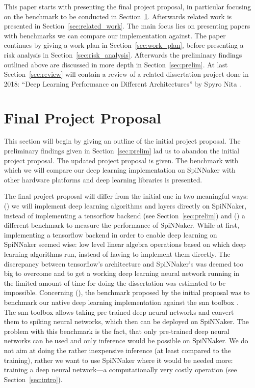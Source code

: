 \documentclass{article}
\begin{document}
This paper starts with presenting the final project
proposal, in particular focusing on the benchmark to be
conducted in Section~\ref{sec:proposal}.
Afterwards related work is presented in
Section~\ref{sec:related_work}.
The main focus lies on presenting papers with benchmarks
we can compare our implementation against.
The paper continues by giving a work plan in
Section~\ref{sec:work_plan}, before presenting a risk
analysis in Section~\ref{sec:risk_analysis}.
Afterwards the preliminary findings outlined above are
discussed in more depth in Section~\ref{sec:prelim}.
At last Section~\ref{sec:review} will contain a review of a
related dissertation project done in 2018:
``Deep Learning Performance on Different Architectures'' by
Spyro Nita \citep{nita_2018}.


\section{Final Project Proposal} %
\label{sec:proposal}

This section will begin by giving an outline of the initial
project proposal.
The preliminary findings given in Section~\ref{sec:prelim}
lad us to abandon the initial project proposal.
The updated project proposal is given.
The benchmark with which we will compare our deep learning
implementation on SpiNNaker with other hardware platforms
and deep learning libraries is presented.

The final project proposal will differ from the initial one
in two meaningful ways: () we will implement
deep learning algorithms and layers directly on SpiNNaker,
instead of implementing a tensorflow backend (see
Section~\ref{sec:prelim}) and () a different
benchmark to measure the performance of SpiNNaker.
While at first, implementing a tensorflow backend in order
to enable deep learning on SpiNNaker seemed wise: low
level linear algebra operations based on which deep
learning algorithms run, instead of having to implement
them directly.
The discrepancy between tensorflow's architecture and
SpiNNaker's was deemed too big to overcome and to get a
working deep learning neural network running in the limited
amount of time for doing the dissertation was estimated to
be impossible.
Concerning (), the benchmark proposed by the
initial proposal was to benchmark our native deep learning
implementation against the snn toolbox
\citep{rueckauer_et_al_2017}.
The snn toolbox allows taking pre-trained deep neural
networks and convert them to spiking neural networks, which
then can be deployed on SpiNNaker.
The problem with this benchmark is the fact, that only
pre-trained deep neural networks can be used and only
inference would be possible on SpiNNaker.
We do not aim at doing the rather inexpensive inference
(at least compared to the training), rather we want to
use SpiNNaker where it would be needed more: training
a deep neural network---a computationally very costly
operation (see Section~\ref{sec:intro}).
\end{document}
